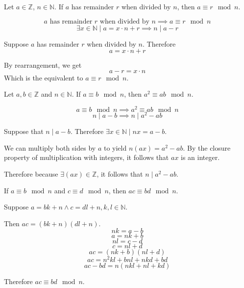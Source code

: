\documentclass[openany, 12pt]{book}
\begin{document}
\begin{exercise}{}{}
	Let $a \in \mathbb{Z}$, $n \in \mathbb{N}$. If $a$ has remainder $r$ when
	divided by $n$, then $a \equiv r \mod n$.
	\begin{alist}
		\item
		$$
			a \text{ has remainder } r \text{ when divided by } n
			\implies
			a \equiv r \mod n
		$$
		$$
			\exists x \in \mathbb{N} \mid a= x \cdot n + r
			\implies
			n \mid a -r
		$$
		\item Suppose $a$ has remainder $r$ when divided by $n$. Therefore
		$$a= x \cdot n + r$$
		\item By rearrangement, we get
		$$a-r= x \cdot n$$
		Which is the equivalent to $a \equiv r \mod n$.
	\end{alist}
\end{exercise}

\begin{exercise}{}{}
	Let $a,b \in \mathbb{Z}$ and $n \in \mathbb{N}$. If $a \equiv b \mod n$, then
	$a^2 \equiv ab \mod n$.
	\begin{alist}
		\item
		$$ a \equiv b \mod n \implies a^2 \equiv ab \mod n $$
		$$ n \mid a - b \implies n \mid a^2 - ab $$
		\item Suppose that $ n \mid a - b $. Therefore $\exists x\in\mathbb{N}\mid nx =
			a-b$.
		\item We can multiply both sides by $a$ to yield $n(ax) = a^2-ab$. By the
		closure property of multiplication with integers, it follows that $ax$ is an
		integer.
		\item Therefore because $\exists(ax)\in\mathbb{Z}$, it follows that $n \mid a^2 - ab$.
	\end{alist}
\end{exercise}

\begin{exercise}{}{}
	If $a \equiv b \mod n$ and $c \equiv d \mod n$, then $ac \equiv bd \mod n$.
	\begin{alist}
		\item Suppose $a=bk + n \land c = dl + n, k, l \in \mathbb{N}$.
		\item Then $ac=(bk + n)(dl + n)$.
		$$nk = a -b$$
		$$a = nk + b$$
		$$nl = c -d$$
		$$c = nl + d$$
		$$ac=(nk + b)(nl + d)$$
		$$ac=n^2kl + bnl + nkd + bd$$
		$$ac-bd=n(nkl + nl + kd)$$
		\item Therefore $ac\equiv bd \mod n$.
	\end{alist}
\end{exercise}
\end{document}
